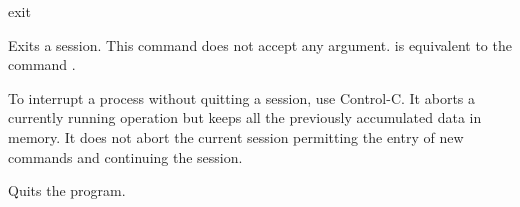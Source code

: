  
\begin{command}{exit}{} 

    \syntax{\obligatory{()}}

    \begin{poydescription}
        Exits a \poy session. This command does not accept any argument.
         is equivalent to the command .

        \begin{statement}
            To interrupt a process without quitting a \poy session, use Control-C.
            It aborts a currently running operation but keeps all the previously
            accumulated data in memory. It does not abort the current session
            permitting the entry of new commands and continuing the session.
        \end{statement}
    
    \end{poydescription}
     
    \begin{poyexamples}
            {Quits the program.}
    \end{poyexamples}

    \begin{poyalso}
    \end{poyalso}

\end{command}



 
